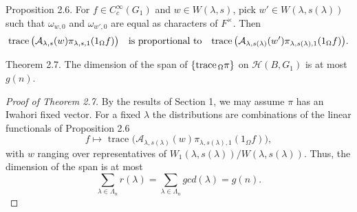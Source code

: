 \documentclass{amsart}
\begin{document}
\proclaim Proposition {2.6}.
For
  $ f \in C_c^{\infty} (G_1) $ and
  $ w \in W (\lambda,s) $,
pick 
  $ w' \in W (\lambda,s(\lambda)) $
such that
  $ \omega_{w,0}$ and $\omega_{w',0} $
  are equal
as characters of 
  $F^{\times} $.
Then
%
$$
  \text{{\rm trace}} \, 
    \bigl(
      {\mathcal A}_{\lambda,s} (w)
      \pi_{\lambda,s,1} 
      ( 1_{\Omega} f)
    \bigr) 
    \quad
    \text{is proportional to}\quad
  \text{{\rm trace}} \, 
    \bigl(
      {\mathcal A}_{\lambda,s(\lambda)} (w')
      \pi_{\lambda,s(\lambda),1} 
      ( 1_{\Omega} f)
    \bigr). 
$$
%
\finishproclaim

\proclaim Theorem {2.7}.
The dimension of the span of
  $ \{ \text{{\rm trace}}_{\, \Omega} \pi \} $
on
  $ {\mathcal H} (B, G_1) $
is at most
  $ g(n) $.
\finishproclaim

\begin{proof}[Proof of Theorem 2.7]
By the results of Section 1, we may assume
  $ \pi $
has an Iwahori fixed vector. 
For a fixed 
  $ \lambda $
the distributions are combinations of
the linear functionals of Proposition 2.6
%
$$
  f \mapsto \text{ trace }
  \bigl(
    {\mathcal A}_{\lambda,s(\lambda)} (w)
    \pi_{\lambda,s(\lambda),1} (1_{\Omega} f)
  \bigr),
$$
%
with
  $ w $
ranging over representatives of 
  $ W_1 (\lambda,s(\lambda)) /
    W   (\lambda,s(\lambda)) $.
Thus, the dimension of the span is at most
%
$$
  \sum_{\lambda \in \Lambda_n}
  r (\lambda) =
  \sum_{\lambda \in \Lambda_n}
  gcd (\lambda) = g(n).
$$
%
\end{proof}
\end{document}
